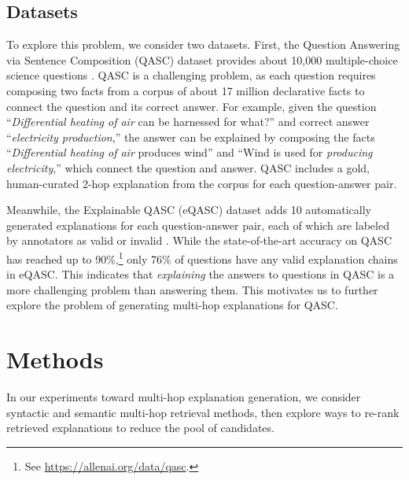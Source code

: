 \documentclass[letterpaper]{article} %
\begin{document}
\subsection{Datasets}
To explore this problem, we consider two datasets. First, the Question Answering via Sentence Composition (QASC) dataset provides about 10,000 multiple-choice science questions \cite{khot2020qasc}. QASC is a challenging problem, as each question requires composing two facts from a corpus of about 17 million declarative facts to connect the question and its correct answer.
For example, given the question ``\textit{Differential heating of air} can be harnessed for what?'' and correct answer ``\textit{electricity production},'' the answer can be explained by composing the facts ``\textit{Differential heating of air} produces wind'' and ``Wind is used for \textit{producing electricity},'' which connect the question and answer.
QASC includes a gold, human-curated 2-hop explanation from the corpus for each question-answer pair.

Meanwhile, the Explainable QASC (eQASC) dataset adds 10 automatically generated explanations for each question-answer pair, each of which are labeled by annotators as valid or invalid \cite{jhamtani-clark-2020-learning}.
While the state-of-the-art accuracy on QASC has reached up to 90\%,\footnote{See \url{https://allenai.org/data/qasc}.} only 76\% of questions have any valid explanation chains in eQASC. This indicates that \textit{explaining} the answers to questions in QASC is a more challenging problem than answering them. This motivates us to further explore the problem of generating multi-hop explanations for QASC.

\section{Methods}
In our experiments toward multi-hop explanation generation, we consider syntactic and semantic multi-hop retrieval methods, then explore ways to re-rank retrieved explanations to reduce the pool of candidates.
\end{document}
